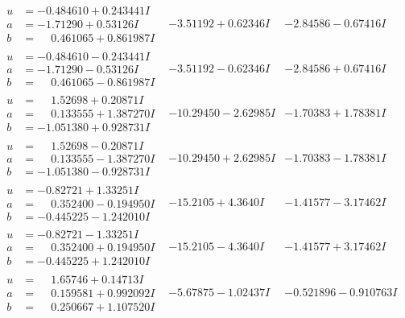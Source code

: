 \documentclass[1p]{elsarticle_modified}
\theoremstyle{definition}
\begin{document}
$$\begin{array}{c|c|c}
\begin{aligned}
u &= -0.484610 + 0.243441 I \\
a &= -1.71290 + 0.53126 I \\
b &= \phantom{-}0.461065 + 0.861987 I\end{aligned}
 & -3.51192 + 0.62346 I & -2.84586 - 0.67416 I \\ \hline\begin{aligned}
u &= -0.484610 - 0.243441 I \\
a &= -1.71290 - 0.53126 I \\
b &= \phantom{-}0.461065 - 0.861987 I\end{aligned}
 & -3.51192 - 0.62346 I & -2.84586 + 0.67416 I \\ \hline\begin{aligned}
u &= \phantom{-}1.52698 + 0.20871 I \\
a &= \phantom{-}0.133555 + 1.387270 I \\
b &= -1.051380 + 0.928731 I\end{aligned}
 & -10.29450 - 2.62985 I & -1.70383 + 1.78381 I \\ \hline\begin{aligned}
u &= \phantom{-}1.52698 - 0.20871 I \\
a &= \phantom{-}0.133555 - 1.387270 I \\
b &= -1.051380 - 0.928731 I\end{aligned}
 & -10.29450 + 2.62985 I & -1.70383 - 1.78381 I \\ \hline\begin{aligned}
u &= -0.82721 + 1.33251 I \\
a &= \phantom{-}0.352400 - 0.194950 I \\
b &= -0.445225 - 1.242010 I\end{aligned}
 & -15.2105 + 4.3640 I & -1.41577 - 3.17462 I \\ \hline\begin{aligned}
u &= -0.82721 - 1.33251 I \\
a &= \phantom{-}0.352400 + 0.194950 I \\
b &= -0.445225 + 1.242010 I\end{aligned}
 & -15.2105 - 4.3640 I & -1.41577 + 3.17462 I \\ \hline\begin{aligned}
u &= \phantom{-}1.65746 + 0.14713 I \\
a &= \phantom{-}0.159581 + 0.992092 I \\
b &= \phantom{-}0.250667 + 1.107520 I\end{aligned}
 & -5.67875 - 1.02437 I & -0.521896 - 0.910763 I \\ \hline\begin{aligned}

\end{aligned}
\end{array}$$
\end{document}
